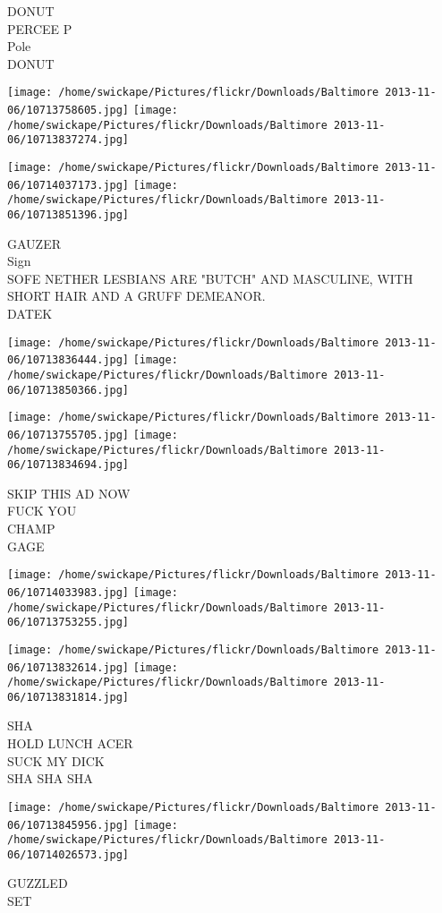 \documentclass[10pt,letterpaper]{article}
\begin{document}
DONUT\\
PERCEE P\\
Pole\\
DONUT
\pagebreak

\texttt{[image: /home/swickape/Pictures/flickr/Downloads/Baltimore 2013-11-06/10713758605.jpg]}
\texttt{[image: /home/swickape/Pictures/flickr/Downloads/Baltimore 2013-11-06/10713837274.jpg]}

\texttt{[image: /home/swickape/Pictures/flickr/Downloads/Baltimore 2013-11-06/10714037173.jpg]}
\texttt{[image: /home/swickape/Pictures/flickr/Downloads/Baltimore 2013-11-06/10713851396.jpg]}

GAUZER\\
Sign\\
SOFE NETHER LESBIANS ARE "BUTCH" AND MASCULINE, WITH SHORT HAIR AND A GRUFF DEMEANOR.\\
DATEK
\pagebreak

\texttt{[image: /home/swickape/Pictures/flickr/Downloads/Baltimore 2013-11-06/10713836444.jpg]}
\texttt{[image: /home/swickape/Pictures/flickr/Downloads/Baltimore 2013-11-06/10713850366.jpg]}

\texttt{[image: /home/swickape/Pictures/flickr/Downloads/Baltimore 2013-11-06/10713755705.jpg]}
\texttt{[image: /home/swickape/Pictures/flickr/Downloads/Baltimore 2013-11-06/10713834694.jpg]}

SKIP THIS AD NOW\\
FUCK YOU\\
CHAMP\\
GAGE
\pagebreak

\texttt{[image: /home/swickape/Pictures/flickr/Downloads/Baltimore 2013-11-06/10714033983.jpg]}
\texttt{[image: /home/swickape/Pictures/flickr/Downloads/Baltimore 2013-11-06/10713753255.jpg]}

\texttt{[image: /home/swickape/Pictures/flickr/Downloads/Baltimore 2013-11-06/10713832614.jpg]}
\texttt{[image: /home/swickape/Pictures/flickr/Downloads/Baltimore 2013-11-06/10713831814.jpg]}

SHA\\
HOLD LUNCH ACER\\
SUCK MY DICK\\
SHA SHA SHA
\pagebreak

\texttt{[image: /home/swickape/Pictures/flickr/Downloads/Baltimore 2013-11-06/10713845956.jpg]}
\texttt{[image: /home/swickape/Pictures/flickr/Downloads/Baltimore 2013-11-06/10714026573.jpg]}

GUZZLED\\
SET
\pagebreak
\end{document}
